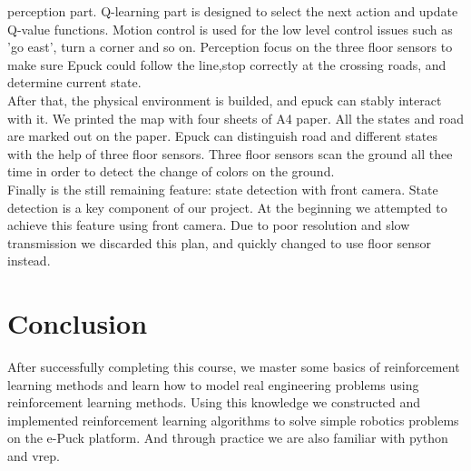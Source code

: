 \documentclass[a4paper, 11pt]{article} %
\begin{document}
perception part. Q-learning part is designed to select the next action and update
Q-value functions. Motion control is used for the low level control issues such as
'go east', turn a corner and so on. Perception focus on the three floor sensors
to make sure Epuck could follow the line,stop correctly at the crossing roads,
and determine current state.
\\[3ex]
After that, the physical environment is builded, and epuck can stably interact with it.
We printed the map with four sheets of A4 paper. All the states and road are marked
out on the paper. Epuck can distinguish road and different states with the help
of three floor sensors. Three floor sensors scan the ground all thee time in order to
detect the change of colors on the ground.
\\[3ex]
Finally is the still remaining feature: state detection with front camera. State
detection is a key component of our project. At the beginning we attempted to
achieve this feature using front camera. Due to poor resolution and slow transmission
we discarded this plan, and quickly changed to use floor sensor instead.

\section{Conclusion}
After successfully completing this course, we master some basics of reinforcement
learning methods and learn how to model real engineering problems using reinforcement
learning methods. Using this knowledge we constructed and implemented reinforcement
learning algorithms to solve simple robotics problems on the e-Puck platform. And
through practice we are also familiar with python and vrep.
\end{document}
